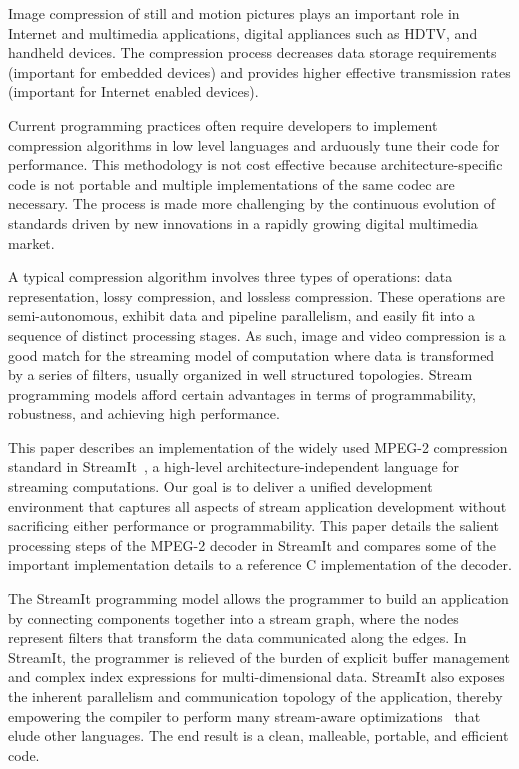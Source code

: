 
Image compression of still and motion pictures plays an important role
in Internet and multimedia applications, digital appliances such as
HDTV, and handheld devices. The compression process decreases data storage
requirements (important for embedded devices) and provides higher
effective transmission rates (important for Internet enabled devices).

Current programming practices often require developers to implement
compression algorithms in low level languages and arduously
tune their code for performance. This methodology is not cost
effective because architecture-specific code is not portable and 
multiple implementations of the same codec are necessary. 
The process is made more challenging by the continuous evolution
of standards driven by new innovations in a rapidly growing 
digital multimedia market.

A typical compression algorithm involves three types of operations:
data representation, lossy compression, and lossless
compression. These operations are semi-autonomous, exhibit data and
pipeline parallelism, and easily fit into a sequence of distinct
processing stages. As such, image and video compression is a good
match for the streaming model of computation where data is transformed
by a series of filters, usually organized in well structured
topologies.  Stream programming models afford certain advantages in
terms of programmability, robustness, and achieving high performance.

This paper describes an implementation of the widely used MPEG-2
compression standard in StreamIt~\cite{streamitcc}, a high-level
architecture-independent language for streaming computations. Our goal
is to deliver a unified development environment that captures all
aspects of stream application development without sacrificing either
performance or programmability. This paper details the salient
processing steps of the MPEG-2 decoder in StreamIt and compares some
of the important implementation details to a reference C
implementation of the decoder.

The StreamIt programming model allows the programmer to build an
application by connecting components together into a stream graph,
where the nodes represent filters that transform the data communicated
along the edges. In StreamIt, the programmer is relieved of the burden
of explicit buffer management and complex index expressions for
multi-dimensional data.  StreamIt also exposes the inherent
parallelism and communication topology of the application, thereby
empowering the compiler to perform many stream-aware
optimizations~\cite{agrawal05cases,gordon02asplos,lamb03pldi,sermulins05lctes}
that elude other languages. The end result is a clean, malleable, portable, and efficient code.
